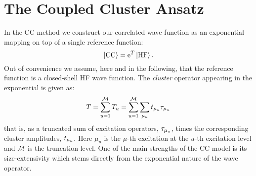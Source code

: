 \section{The Coupled Cluster Ansatz}\label{sec:coupled-cluster}

In the \acrlong{CC} method we construct our correlated wave function as
an exponential mapping on top of a single reference
function:\autocite{Crawford2000-ey, Helgaker2000-tz, Bartlett2007-mz,
Shavitt2009-mr}
\begin{equation}
  \label{eq:cluster}
  \ket{\mathrm{CC}} = \mathrm{e}^{T}\ket{\mathrm{HF}}.
\end{equation}
Out of convenience we assume, here and in the following, that the
reference function is a closed-shell \acrshort{HF} wave function.
The \emph{cluster} operator appearing in the exponential is given as:
\begin{equation}
  T = \sum_{u=1}^\mathcal{M} T_u = \sum_{u=1}^\mathcal{M}\sum_{\mu_u}t_{\mu_u}\tau_{\mu_u}
\end{equation}
that is, as a truncated sum of excitation operators, $\tau_{\mu_u}$,
times the corresponding cluster amplitudes, $t_{\mu_u}$.
Here $\mu_u$ is the $\mu$-th excitation at the $u$-th excitation level and
$\mathcal{M}$ is the truncation level.
One of the main strengths of the \acrshort{CC} model is its size-extensivity
which stems directly from the exponential nature of the wave
operator.\autocite{Shavitt2009-mr, Helgaker2000-tz}

